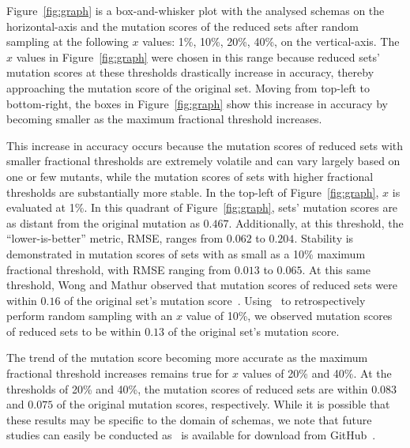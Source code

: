 Figure~\ref{fig:graph} is a box-and-whisker plot with the analysed schemas on the horizontal-axis and the mutation
scores of the reduced sets after random sampling at the following $x$ values: 1\%, 10\%, 20\%, 40\%, on the
vertical-axis. The $x$ values in Figure~\ref{fig:graph} were chosen in this range because reduced sets' mutation scores
at these thresholds drastically increase in accuracy, thereby approaching the mutation score of the original set. Moving
from top-left to bottom-right, the boxes in Figure~\ref{fig:graph} show this increase in accuracy by becoming smaller as
the maximum fractional threshold increases.

This increase in accuracy occurs because the mutation scores of reduced sets with smaller fractional thresholds are
extremely volatile and can vary largely based on one or few mutants, while the mutation scores of sets with higher
fractional thresholds are substantially more stable. In the top-left of Figure~\ref{fig:graph}, $x$ is evaluated at 1\%.
In this quadrant of Figure~\ref{fig:graph}, sets' mutation scores are as distant from the original mutation as $0.467$.
Additionally, at this threshold, the ``lower-is-better'' metric, RMSE, ranges from $0.062$ to $0.204$.  Stability is
demonstrated in mutation scores of sets with as small as a 10\% maximum fractional threshold, with RMSE ranging from
$0.013$ to $0.065$.  At this same threshold, Wong and Mathur observed that mutation scores of reduced sets were within
$0.16$ of the original set's mutation score~\cite{mathur1994empirical}. Using \mr~to retrospectively perform random
sampling with an $x$ value of 10\%, we observed mutation scores of reduced sets to be within $0.13$ of the original
set's mutation score.

The trend of the mutation score becoming more accurate as the maximum fractional threshold increases remains true for
$x$ values of 20\% and 40\%. At the thresholds of 20\% and 40\%, the mutation scores of reduced sets are within $0.083$
and $0.075$ of the original mutation scores, respectively. While it is possible that these results may be specific to
the domain of schemas, we note that future studies can easily be conducted as \mr~is available for download from
GitHub~\cite{tool}.



